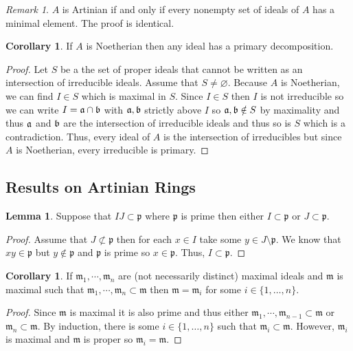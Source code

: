 \documentclass[12pt]{article}
\newcommand{\p}{\mathfrak{p}}
\newcommand{\m}{\mathfrak{m}}
\theoremstyle{remark}
\newtheorem*{remark}{Remark}
\theoremstyle{definition}
\newtheorem{lemma}[theorem]{Lemma}
\newtheorem{corollary}[theorem]{Corollary}
\begin{document}
\begin{remark}
$A$ is Artinian if and only if every nonempty set of ideals of $A$ has a minimal element. The proof is identical. 
\end{remark}

\begin{corollary}
If $A$ is Noetherian then any ideal has a primary decomposition.
\end{corollary}

\begin{proof}
Let $S$ be a the set of proper ideals that cannot be written as an intersection of irreducible ideals. Assume that $S \neq \varnothing$. Because $A$ is Noetherian, we can find $I \in S$ which is maximal in $S$. Since $I \in S$ then $I$ is not irreducible so we can write $I = \mathfrak{a} \cap \mathfrak{b}$ with $\mathfrak{a}, \mathfrak{b}$ strictly above $I$ so $\mathfrak{a}, \mathfrak{b} \notin S$ by maximality and thus $\mathfrak{a}$ and $\mathfrak{b}$ are the intersection of irreducible ideals and thus so is $S$ which is a contradiction. Thus, every ideal of $A$ is the intersection of irreducibles but since $A$ is Noetherian, every irreducible is primary. 
\end{proof}

\subsection{Results on Artinian Rings}


\begin{lemma}
Suppose that $IJ \subset \p$ where $\p$ is prime then either $I \subset \p$ or $J \subset \p$. 
\end{lemma}

\begin{proof}
Assume that $J \not\subset \p$ then for each $x \in I$ take some $y \in J \setminus \p$. We know that $xy \in \p$ but $y \notin \p$ and $\p$ is prime so $x \in \p$. Thus, $I \subset \p$. 
\end{proof}

\begin{corollary}
If $\m_1, \cdots, \m_n$ are (not necessarily distinct) maximal ideals and $\m$ is maximal such that $\m_1, \cdots, \m_n \subset \m$ then $\m = \m_i$ for some $i \in \{ 1, \dots, n \}$.
\end{corollary}

\begin{proof}
Since $\m$ is maximal it is also prime and thus either $\m_1, \cdots, \m_{n-1} \subset \m$ or $\m_n \subset \m$. By induction, there is some $i \in \{1, \dots, n\}$ such that $\m_i \subset \m$. However, $\m_i$ is maximal and $\m$ is proper so $\m_i = \m$. 
\end{proof}
\end{document}
